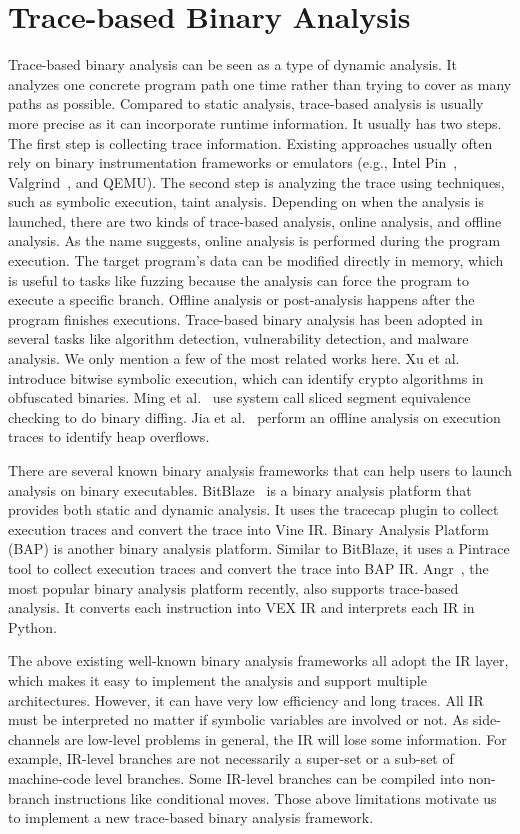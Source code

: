 \section{Trace-based Binary Analysis}
Trace-based binary analysis can be seen as a type of dynamic analysis. It analyzes one concrete program path one time rather than trying to cover
as many paths as possible. Compared to static analysis, trace-based analysis
is usually more precise as it can incorporate runtime information. It usually has
two steps. The first step is collecting trace information. Existing
approaches usually often rely on binary instrumentation frameworks or emulators (e.g., Intel Pin~\cite{luk2005pin},
Valgrind~\cite{nethercote2007valgrind}, and QEMU). The second step is analyzing the trace using techniques, such
as symbolic execution, taint analysis. Depending on when the analysis is launched,
there are two kinds of trace-based analysis, online analysis, and offline analysis. As the name suggests, online analysis is performed during the program execution. The target program's data can be modified directly in memory, which is useful to tasks like fuzzing because the analysis
can force the program to execute a specific branch. 
Offline analysis or post-analysis happens after the program finishes executions. 
Trace-based binary analysis has been adopted in several tasks like algorithm
detection, vulnerability detection, and malware analysis. We only mention a few of
the most related works here. Xu et al.~\cite{xu2017cryptographic} introduce bitwise symbolic execution, which can
identify crypto algorithms in obfuscated binaries. Ming et al.~\cite{ming2017binsim} use system call sliced segment equivalence checking to do binary diffing. Jia et al.~\cite{jia2017towards}
perform an offline analysis on execution traces to identify heap overflows.

There are several known binary analysis frameworks that can help users to launch analysis on binary executables. BitBlaze~\cite{brumley2011bap} is a binary analysis platform that provides both static and dynamic analysis. It uses the tracecap plugin to collect execution traces and convert the trace into Vine IR. Binary Analysis Platform (BAP)
is another binary analysis platform. Similar to BitBlaze, it uses a Pintrace tool to
collect execution traces and convert the trace into BAP IR. Angr~\cite{shoshitaishvili2016state}, the most popular
binary analysis platform recently, also supports trace-based analysis. It converts each instruction into VEX IR and interprets each IR in Python. 

The above existing well-known binary analysis frameworks all adopt the IR layer, which makes it easy to implement the analysis and support multiple architectures. However, it can have very low efficiency and long traces. All IR must be interpreted no matter if symbolic variables are involved or not. As side-channels are low-level problems in general, the IR will lose some information. For example, IR-level branches are not necessarily a super-set or a sub-set of machine-code level branches. Some IR-level branches can be compiled into non-branch instructions like conditional moves. Those above limitations motivate us to implement a new trace-based binary analysis framework.